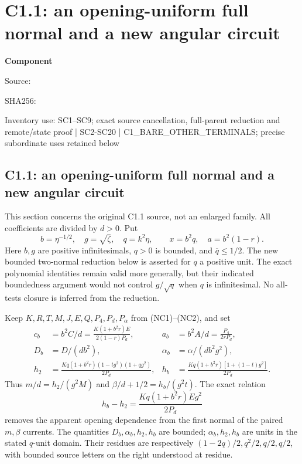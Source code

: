 \chapter{C1.1: an opening-uniform full normal and a new angular circuit}
\label{component:p9afbe73899af}
\noindent\textbf{Component }\par
{\small\noindent Source: \par}
{\small\noindent SHA256: \par}
{\small\noindent Inventory use: SC1--SC9; exact source cancellation, full-parent reduction and remote/state proof | SC2-SC20 | C1\_\allowbreak{}BARE\_\allowbreak{}OTHER\_\allowbreak{}TERMINALS; precise subordinate uses retained below\par}
\medskip
\section{C1.1: an opening-uniform full normal and a new angular circuit}
\label{p9afbe73899af:sec:r7-c1-small}
This section concerns the original C1.1 source, not an enlarged family.
All coefficients are divided by $d>0$. Put
\[
 b=\eta^{-1/2},\quad g=\sqrt\zeta,\quad q=k^2\eta,
 \qquad x=b^2q,\quad a=b^2(1-r).
 \tag{SC1}
\]
Here $b,g$ are positive infinitesimals, $q>0$ is bounded, and
$\overline q\le1/2$. The new bounded two-normal reduction below is
asserted for $q$ a positive unit. The exact polynomial identities
remain valid more generally, but their indicated boundedness argument
would not control $g/\sqrt q$ when $q$ is infinitesimal.
No all-tests closure is inferred from the reduction.

Keep $K,R,T,M,J,E,Q,P_4,P_d,P_\alpha$ from (NC1)--(NC2), and set
\[
\begin{aligned}
 c_b&=b^2C/d=\frac{K(1+b^2r)E}{2(1-r)P_d},&
 a_b&=b^2A/d=\frac{P_4}{2rP_d},\\
 D_b&=D/(db^2),&\alpha_b&=\alpha/(db^2g^2),\\
 h_2&=\frac{Kq(1+b^2r)(1-tg^2)(1+qg^2)}{2P_d},&
 h_b&=\frac{Kq(1+b^2r)[1+(1-t)g^2]}{2P_d}.
\end{aligned}
\]
Thus $m/d=h_2/(g^2M)$ and $\beta/d+1/2=h_b/(g^2t)$.
The exact relation
\[
 h_b-h_2=\frac{Kq(1+b^2r)E g^2}{2P_d}
 \tag{SC2}
\]
removes the apparent opening dependence from the first normal of the
paired $m,\beta$ currents. The quantities $D_b,\alpha_b,h_2,h_b$ are
bounded; $\alpha_b,h_2,h_b$ are units in the stated $q$-unit domain.
Their residues are respectively $(1-2q)/2,q^2/2,q/2,q/2$, with
bounded source letters on the right understood at residue.

